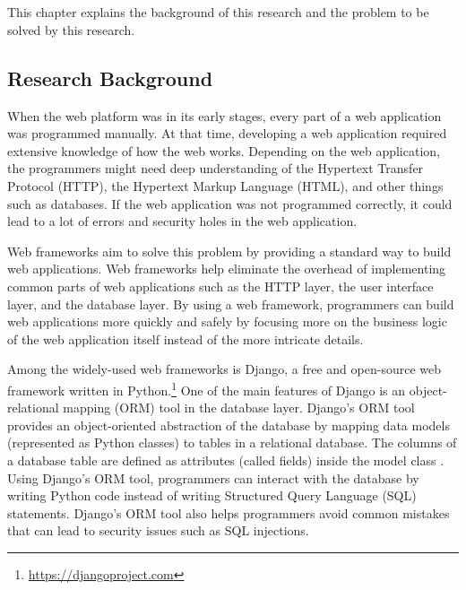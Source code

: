 \chapter{\babSatu}

This chapter explains the background of this research and the problem to be
solved by this research.

\section{Research Background}

When the web platform was in its early stages, every part of a web application
was programmed manually. At that time, developing a web application required
extensive knowledge of how the web works. Depending on the web application, the
programmers might need deep understanding of the Hypertext Transfer Protocol
(HTTP), the Hypertext Markup Language (HTML), and other things such as
databases. If the web application was not programmed correctly, it could lead
to a lot of errors and security holes in the web application.

Web frameworks aim to solve this problem by providing a standard way to build
web applications. Web frameworks help eliminate the overhead of implementing
common parts of web applications such as the HTTP layer, the user interface
layer, and the database layer. By using a web framework, programmers can build
web applications more quickly and safely by focusing more on the business logic
of the web application itself instead of the more intricate details.

Among the widely-used web frameworks is Django, a free and open-source web
framework written in Python.\footnote{\url{https://djangoproject.com}} One of
the main features of Django is an object-relational mapping (ORM) tool in the
database layer. Django's ORM tool provides an object-oriented abstraction of
the database by mapping data models (represented as Python classes) to tables
in a relational database. The columns of a database table are defined as
attributes (called fields) inside the model class \cite{django}. Using Django's
ORM tool, programmers can interact with the database by writing Python code
instead of writing Structured Query Language (SQL) statements. Django's ORM
tool also helps programmers avoid common mistakes that can lead to security
issues such as SQL injections.

